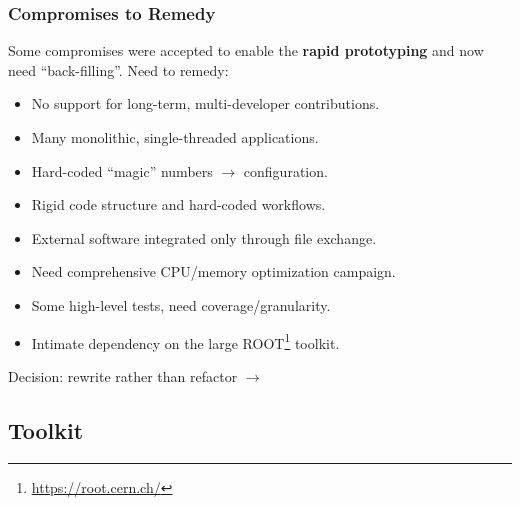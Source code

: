 \documentclass[xcolor=dvipsnames]{beamer}
\begin{document}
\begin{frame}
  \frametitle{Compromises to Remedy}

  Some compromises were accepted to enable
 the \textbf{rapid prototyping} and now need
  ``back-filling''.  Need to remedy:

  \begin{itemize}
  \item No support for long-term, multi-developer contributions.
  \item Many monolithic, single-threaded applications.
  \item Hard-coded ``magic'' numbers $\to$ configuration.
  \item Rigid code structure and hard-coded workflows.
  \item External software integrated only through file exchange.
  \item Need comprehensive CPU/memory optimization campaign.
  \item Some high-level tests, need coverage/granularity.
  \item Intimate dependency on the large
    ROOT\footnote{\url{https://root.cern.ch/}} toolkit.
  \end{itemize}

  Decision: rewrite rather than refactor $\longrightarrow$
  
\end{frame}

\subsection{Toolkit}
\end{document}
